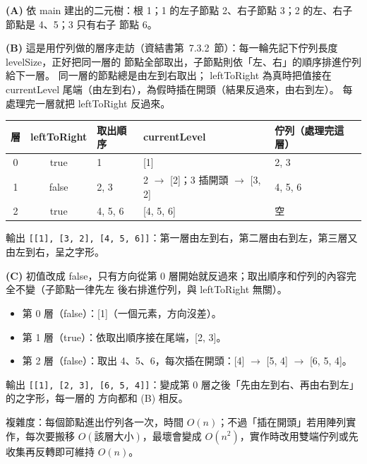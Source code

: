 \begin{pastsoln}
\textbf{(A)} 依 main 建出的二元樹：根 1；1 的左子節點 2、右子節點 3；2 的左、右子節點是 4、5；3 只有右子
節點 6。
\begin{center}
\end{center}

\textbf{(B)} 這是用佇列做的層序走訪（資結書第~7.3.2~節）：每一輪先記下佇列長度 levelSize，正好把同一層的
節點全部取出，子節點則依「左、右」的順序排進佇列給下一層。 同一層的節點總是由左到右取出；
leftToRight 為真時把值接在 currentLevel 尾端（由左到右），為假時插在開頭（結果反過來，由右到左）。
每處理完一層就把 leftToRight 反過來。
\begin{center}
\small
\begin{tabular}{cclll}
\toprule
層 & leftToRight & 取出順序 & currentLevel & 佇列（處理完這層） \\
\midrule
0 & true & 1 & [1] & 2, 3 \\
1 & false & 2, 3 & 2 $\to$ [2]；3 插開頭 $\to$ [3, 2] & 4, 5, 6 \\
2 & true & 4, 5, 6 & [4, 5, 6] & 空 \\
\bottomrule
\end{tabular}
\end{center}
輸出 \texttt{[[1], [3, 2], [4, 5, 6]]}：第一層由左到右，第二層由右到左，第三層又由左到右，呈之字形。

\textbf{(C)} 初值改成 false，只有方向從第 0 層開始就反過來；取出順序和佇列的內容完全不變（子節點一律先左
後右排進佇列，與 leftToRight 無關）。
\begin{itemize}
\item 第 0 層（false）：[1]（一個元素，方向沒差）。
\item 第 1 層（true）：依取出順序接在尾端，[2, 3]。
\item 第 2 層（false）：取出 4、5、6，每次插在開頭：[4] $\to$ [5, 4] $\to$ [6, 5, 4]。
\end{itemize}
輸出 \texttt{[[1], [2, 3], [6, 5, 4]]}：變成第 0 層之後「先由左到右、再由右到左」的之字形，每一層的
方向都和 (B) 相反。

複雜度：每個節點進出佇列各一次，時間 $O(n)$；不過「插在開頭」若用陣列實作，每次要搬移
$O(\text{該層大小})$，最壞會變成 $O(n^2)$，實作時改用雙端佇列或先收集再反轉即可維持 $O(n)$。
\end{pastsoln}

